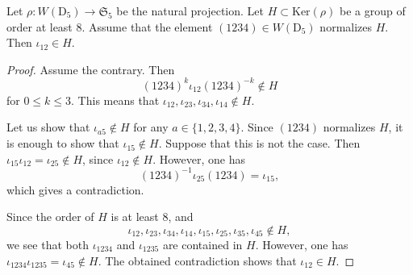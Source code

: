 \documentclass[10pt,a4paper]{amsart}
\def \le {\leqslant}
\begin{document}
\begin{lemma}\label{lemma:iota12}
Let $\rho\colon W(\mathrm{D}_5)\to \mathfrak{S}_5$
be the natural projection. Let $H \subset \mathrm{Ker}(\rho)$ be a group of order at least $8.$ Assume that the element $(1234) \in W(\mathrm{D}_5)$ normalizes $H.$ Then $\iota_{12} \in H.$
\end{lemma}

\begin{proof}
Assume the contrary. Then
$$
(1234)^k \iota_{12} (1234)^{-k} \notin H
$$
for $0\le k \le 3$.
This means that $\iota_{12}, \iota_{23}, \iota_{34}, \iota_{14} \notin H$.

Let us show that $\iota_{a5} \notin H$ for any $a \in \{1,2,3,4\}$.
Since $(1234)$ normalizes $H$, it is enough to show that
$\iota_{15}\notin H$. Suppose that this is not the case.
Then $\iota_{15}\iota_{12}=\iota_{25}\notin H$,
since $\iota_{12} \notin H$.
However, one has
$$
(1234)^{-1} \iota_{25} (1234)=\iota_{15},
$$
which gives a contradiction.


Since the order of $H$ is at least $8$, and
$$
\iota_{12}, \iota_{23}, \iota_{34}, \iota_{14},
\iota_{15}, \iota_{25}, \iota_{35}, \iota_{45} \notin H,
$$
we see that both $\iota_{1234}$ and $\iota_{1235}$ are contained
in $H$. However, one has
$\iota_{1234}\iota_{1235}=\iota_{45} \notin H$. The obtained contradiction
shows that $\iota_{12} \in H$.
\end{proof}
\end{document}
